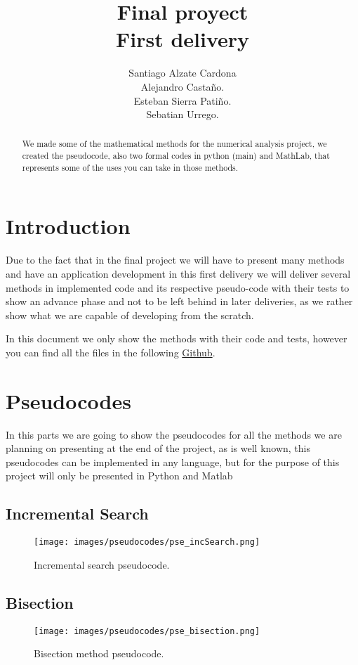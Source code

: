 \documentclass{article}
\title{\textbf{Final proyect} \\
        First delivery}
\author{Santiago Alzate Cardona\\
        Alejandro Castaño.\\
        Esteban Sierra Patiño.\\
        Sebatian Urrego.}
\begin{document}
\maketitle

\begin{abstract}
We made some of the mathematical methods for the numerical analysis project, we created the pseudocode, also two formal codes in python (main) and MathLab, that represents some of the uses you can take in those methods.
\end{abstract}

\section{Introduction}

Due to the fact that in the final project we will have to present many methods and have an application development in this first delivery we will deliver several methods in implemented code and its respective pseudo-code with their tests to show an advance phase and not to be left behind in later deliveries, as we rather show what we are capable of developing from the scratch.

In this document we only show the methods with their code and tests, however you can find all the files in the following \href{https://github.com/tali0517/Analisis-numerico}{Github}.

\section{Pseudocodes}
 In this parts we are going to show the pseudocodes for all the methods we are planning on presenting at the end of the project, as is well known, this pseudocodes can be implemented in any language, but for the purpose of this project will only be presented in Python and Matlab 

\subsection{Incremental Search}
\begin{figure}[ht]
\centering
\texttt{[image: images/pseudocodes/pse\_incSearch.png]}
\caption{\label{fig:py_bisc}Incremental search pseudocode.}
\end{figure}
\FloatBarrier

\subsection{Bisection}
\begin{figure}[ht]
\centering
\texttt{[image: images/pseudocodes/pse\_bisection.png]}
\caption{\label{fig:py_bisc}Bisection method pseudocode.}
\end{figure}
\FloatBarrier
\end{document}
